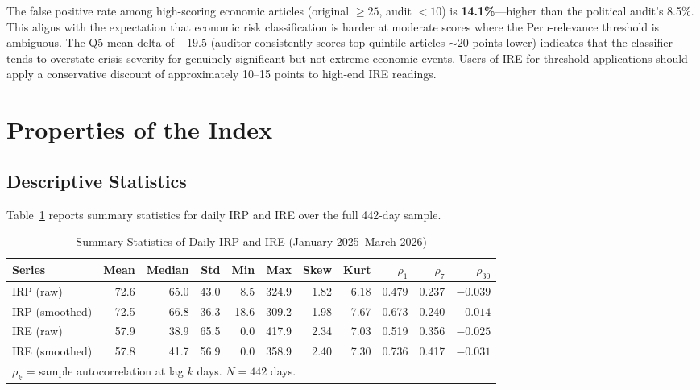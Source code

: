 \documentclass[12pt,a4paper]{article}
\begin{document}
The false positive rate among high-scoring economic articles (original
$\geq 25$, audit $< 10$) is \textbf{14.1\%}---higher than the political
audit's 8.5\%.  This aligns with the expectation that economic risk
classification is harder at moderate scores where the Peru-relevance
threshold is ambiguous.  The Q5 mean delta of $-19.5$ (auditor consistently
scores top-quintile articles $\sim 20$ points lower) indicates that the
classifier tends to overstate crisis severity for genuinely significant but
not extreme economic events.  Users of IRE for threshold applications should
apply a conservative discount of approximately 10--15 points to high-end
IRE readings.

\section{Properties of the Index}
\label{sec:properties}

\subsection{Descriptive Statistics}
\label{subsec:descriptive}

Table~\ref{tab:summary} reports summary statistics for daily IRP and IRE
over the full 442-day sample.

\begin{table}[h!]
\centering
\caption{Summary Statistics of Daily IRP and IRE (January 2025--March 2026)}
\label{tab:summary}
\begin{tabular}{lrrrrrrrrrr}
\toprule
Series & Mean & Median & Std & Min & Max & Skew & Kurt & $\rho_1$ & $\rho_7$ & $\rho_{30}$ \\
\midrule
IRP (raw)      & 72.6 & 65.0 & 43.0 &  8.5 & 324.9 & 1.82 & 6.18 & 0.479 & 0.237 & $-0.039$ \\
IRP (smoothed) & 72.5 & 66.8 & 36.3 & 18.6 & 309.2 & 1.98 & 7.67 & 0.673 & 0.240 & $-0.014$ \\
IRE (raw)      & 57.9 & 38.9 & 65.5 &  0.0 & 417.9 & 2.34 & 7.03 & 0.519 & 0.356 & $-0.025$ \\
IRE (smoothed) & 57.8 & 41.7 & 56.9 &  0.0 & 358.9 & 2.40 & 7.30 & 0.736 & 0.417 & $-0.031$ \\
\bottomrule
\multicolumn{11}{l}{\footnotesize $\rho_k$ = sample autocorrelation at lag $k$ days. $N = 442$ days.}
\end{tabular}
\end{table}
\end{document}

